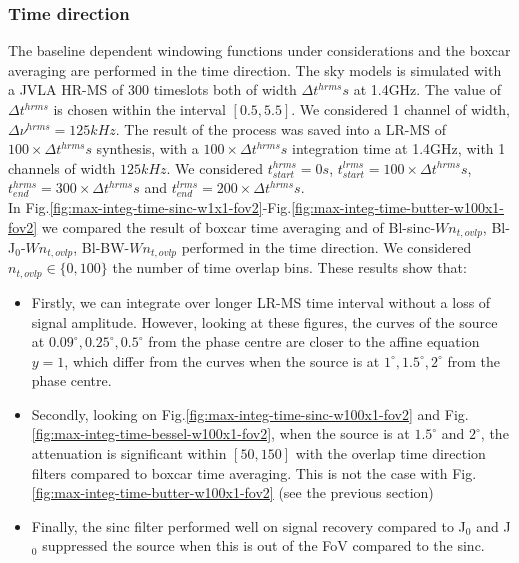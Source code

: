 \documentclass[useAMS,usenatbib]{mn2e}
\begin{document}
\subsubsection{Time direction}
The baseline dependent windowing functions under considerations and the boxcar averaging are performed in the time direction.
The sky models is simulated with a JVLA HR-MS of $300$ timeslots both of width $\Delta t^{hrms}s$ at 1.4GHz. The value of  
$\Delta t^{hrms}$ is chosen within the interval $[0.5,5.5]$. We considered 1 channel of width, $\Delta \nu^{hrms}=125kHz$. The result of the 
process was saved into a LR-MS of $100\times\Delta t^{hrms}s$ synthesis, with a $100\times\Delta t^{hrms}s$ integration time at 1.4GHz, with 
1 channels of width $125kHz$. We considered $t^{hrms}_{start}=0s$, $t^{lrms}_{start}=100\times\Delta t^{hrms} s$, 
$t^{hrms}_{end}=300\times\Delta t^{hrms}s$ and $t^{lrms}_{end}=200\times\Delta t^{hrms}s$.\\
In Fig.\ref{fig:max-integ-time-sinc-w1x1-fov2}-Fig.\ref{fig:max-integ-time-butter-w100x1-fov2} we compared the result of boxcar time
averaging and of  Bl-sinc-$W n_{t,ovlp}$, Bl-J$_0$-$W n_{t,ovlp}$, Bl-BW-$W n_{t,ovlp}$ performed in the time 
direction. We considered $n_{t,ovlp}\in\{0,100\}$ the number of time overlap bins. These results show that:
\begin{itemize}
 \item Firstly,  we can integrate over longer LR-MS time interval without a loss of signal 
amplitude. However, looking at these figures, the curves of the source at $0.09^{\circ},0.25^{\circ},0.5^{\circ}$ from the phase centre are 
closer to the affine equation $y=1$, which differ from the curves when the source is at $1^{\circ},1.5^{\circ}, 2^{\circ}$ from the phase 
centre.  
 \item Secondly, looking on Fig.\ref{fig:max-integ-time-sinc-w100x1-fov2} and Fig.\ref{fig:max-integ-time-bessel-w100x1-fov2}, when the 
source is at $1.5^{\circ}$ and $2^{\circ}$, the attenuation is significant within 
$[50,150]$ with the overlap time direction filters compared to boxcar time averaging. This is not the case with 
Fig.\ref{fig:max-integ-time-butter-w100x1-fov2} (see the previous section)
 \item Finally, the sinc filter performed well on signal recovery compared to J$_0$ and J$_0$ suppressed 
the source when this is out of the FoV compared to the sinc.  
\end{itemize}
\end{document}
